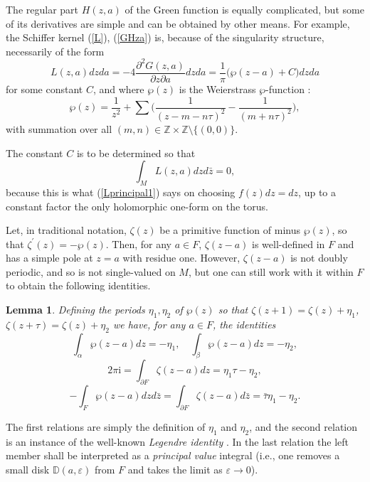 \documentclass[reqno,12pt]{article}
\theoremstyle{plain}
\newtheorem{lemma}[thm]{Lemma}
\theoremstyle{definition}
\numberwithin{equation}{section}
\numberwithin{figure}{section}
\def\I{\mathrm{i}}
\def\D{{\mathbb D}}
\def\Z{{\mathbb Z}}
\begin{document}
The regular part $H(z,a)$ of the Green function is equally complicated, but some of its derivatives
are simple and can be obtained by other means. 
For example, the Schiffer kernel  (\ref{L}), (\ref{GHza}) is, because of the singularity structure, necessarily of the form
$$
L(z,a)dzda=-4\frac{\partial^2 G(z,a)}{\partial z \partial a}dzda=\frac{1}{\pi}\big( \wp(z-a)+C\big)dzda
$$
for some constant $C$,
 and where $\wp(z)$ is the Weierstrass $\wp$-function \cite{Ahlfors-1966}:
$$
\wp(z)=\frac{1}{z^2}+\sum\Big(\frac{1}{(z-m-n\tau)^2}-\frac{1}{(m+n\tau)^2}\Big),
$$
with summation over all $(m,n)\in\Z\times \Z \setminus \{(0,0)\}$.
 
The constant $C$ is to be determined so that 
\begin{equation}\label{C}
\int_M L(z,a)dzd\bar{z}=0,
\end{equation}
because this is what (\ref{Lprincipal1}) says on choosing $f(z)dz=dz$, up to a constant factor the only holomorphic
one-form on the torus. 

Let, in traditional notation, $\zeta(z)$ be a primitive function of minus $\wp(z)$, so that
$\zeta^\prime(z)=-\wp({z})$. Then, for any $a\in F$, $\zeta(z-a)$ is well-defined in $F$ and has a simple pole at $z=a$ with
residue one. However, $\zeta(z-a)$ is not doubly periodic, and so is not single-valued on $M$, but one can
still work with it within $F$ to obtain the following identities.

\begin{lemma}\label{lem:torus}
Defining the periods $\eta_1, \eta_2$ of $\wp(z)$ so that $\zeta(z+1)=\zeta(z)+\eta_1$, $\zeta(z+\tau)=\zeta(z)+\eta_2$ 
we have, for any $a\in F$, the identities
$$
\int_\alpha \wp(z-a)dz=-\eta_1, \quad \int_\beta \wp(z-a)dz=-\eta_2,
$$
$$
2\pi \I=\int_{\partial F}\zeta(z-a)dz=\eta_1 \tau-\eta_2,
$$
$$
-\int_F\wp(z-a)dzd\bar{z}=\int_{\partial F}\zeta(z-a)d\bar{z}=\bar{\tau}\eta_1-\eta_2.
$$
\end{lemma} 

The first relations are simply the definition of $\eta_1$ and $\eta_2$, and the second relation 
is an instance of the well-known {\it Legendre identity} \cite{Ahlfors-1966}. In the last relation the left member shall be
interpreted as a {\it principal value} integral (i.e., one removes a small disk $\D(a,\varepsilon)$ from $F$ and takes the
limit as $\varepsilon\to 0$).
\end{document}
